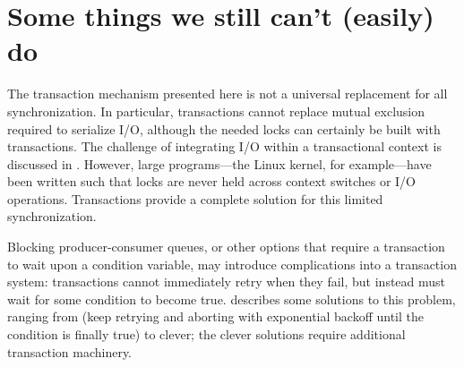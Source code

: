 \section{Some things we still can't (easily) do}\label{sec:xlimit}
The transaction mechanism presented here is not a universal
replacement for all synchronization.  In particular, transactions
cannot replace mutual exclusion
required to serialize I/O, although the needed locks can certainly be
built with transactions.  
The challenge of integrating I/O within a
transactional context is discussed in .
However, large programs---the
Linux kernel, for example---have been
written such that locks are
never held across context switches or I/O operations.  Transactions
provide a complete solution for this limited synchronization.

Blocking producer-consumer queues, or other options that require a
transaction to wait upon a condition variable, may introduce
complications into a transaction system: transactions cannot
immediately retry when they fail, but instead must wait for some
condition to become true.   describes some
solutions to this problem, ranging from \naive (keep retrying and
aborting with exponential backoff until the condition is finally true)
to clever; the clever solutions require additional transaction
machinery.



